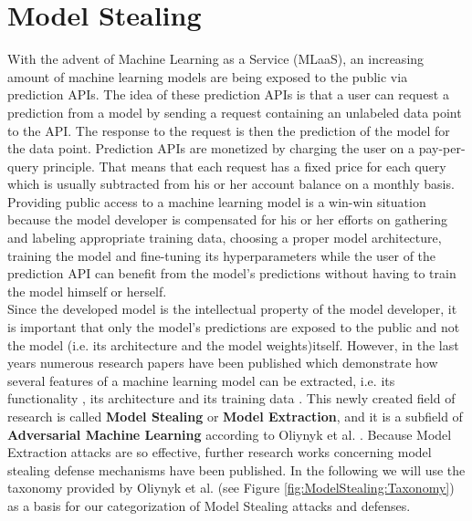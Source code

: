 \section{Model Stealing}
\label{sec:ModelStealing}
With the advent of Machine Learning as a Service (MLaaS), an increasing amount of machine learning models are being exposed to the public via 
prediction APIs. The idea of these prediction APIs is that a user can request a prediction from a model by sending a request containing an unlabeled data
point to the API. The response to the request is then the prediction of the model for the data point. Prediction APIs are monetized by charging the user
on a pay-per-query principle. That means that each request has a fixed price for each query which is usually subtracted from his or her account balance on
a monthly basis. Providing public access to a machine learning model is a win-win situation because the model developer is compensated for his or her efforts
on gathering and labeling appropriate training data, choosing a proper model architecture, training the model and fine-tuning its hyperparameters while the user
of the prediction API can benefit from the model's predictions without having to train the model himself or herself. \\
Since the developed model is the intellectual property of the model developer, it is important that only the model's predictions are exposed to the public and
not the model (i.e. its architecture and the model weights)itself. However, in the last years numerous research papers have been published which demonstrate how
several features of a machine learning model can be extracted, i.e. its functionality \cite{tramer2016stealing}, its architecture \cite{oh2019towards} and its
training data \cite{shokri2017membership}. This newly created field of research is called \textbf{Model Stealing} or \textbf{Model Extraction}, and it is a subfield
of \textbf{Adversarial Machine Learning} according to Oliynyk et al. \cite{oliynyk2022know}. Because Model Extraction attacks are so effective, further research works
concerning model stealing defense mechanisms have been published. In the following we will use the taxonomy provided by Oliynyk et al. (see Figure 
\ref{fig:ModelStealing:Taxonomy}) \cite{oliynyk2022know} as a basis for our categorization of Model Stealing attacks and defenses. \\

